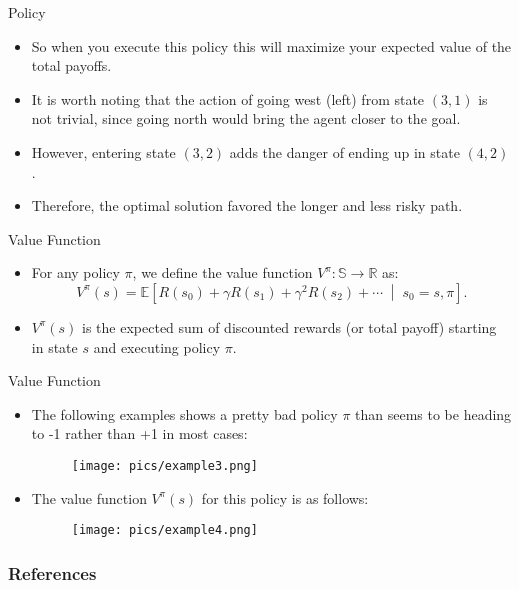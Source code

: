 \documentclass[handout]{beamer}
\begin{document}
\begin{frame}{Policy}
\scriptsize
\begin{itemize}
\item So when you execute this policy this will maximize your expected value of the total payoffs.

\item It is worth noting that the action of going west (left) from state $(3,1)$ is not trivial, since going north would bring the agent closer to the goal.
\item However, entering state $(3,2)$ adds the danger of ending up in state $(4,2)$.
\item Therefore, the optimal solution favored the longer and less risky path. 

\end{itemize}


\end{frame}


\begin{frame}{Value Function}
\scriptsize
\begin{itemize}
    \item  For any policy \( \pi \), we define the value function $V^{\pi}: \mathbb{S} \rightarrow \mathbb{R}$ as:
    \[
    V^{\pi}(s) = \mathbb{E}\left[R(s_0) + \gamma R(s_1) + \gamma^2 R(s_2) + \cdots \;\middle|\; s_0 = s, \pi\right].
    \]
    \item \( V^{\pi}(s) \) is the expected sum of discounted rewards (or total payoff) starting in state \( s \) and executing policy \( \pi \).
\end{itemize}
\end{frame}

\begin{frame}{Value Function}
\scriptsize
\begin{itemize}
    \item  The following examples shows a pretty bad policy \( \pi \) than seems to be heading to -1 rather than +1 in most cases:
\begin{figure}[h]
        	\texttt{[image: pics/example3.png]}
        \end{figure}
    \item The value function \( V^{\pi}(s) \) for this policy is as follows:
    
\begin{figure}[h]
        	\texttt{[image: pics/example4.png]}
        \end{figure}
\end{itemize}
\end{frame}




\begin{frame}[allowframebreaks]\scriptsize
\frametitle{References}


%
\end{frame}  









\end{document}
